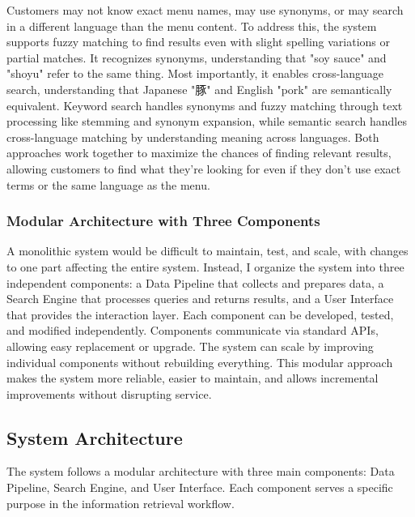 \documentclass[11pt,a4paper]{article}
\begin{document}
Customers may not know exact menu names, may use synonyms, or may search in a different language than the menu content. To address this, the system supports fuzzy matching to find results even with slight spelling variations or partial matches. It recognizes synonyms, understanding that "soy sauce" and "shoyu" refer to the same thing. Most importantly, it enables cross-language search, understanding that Japanese "豚" and English "pork" are semantically equivalent. Keyword search handles synonyms and fuzzy matching through text processing like stemming and synonym expansion, while semantic search handles cross-language matching by understanding meaning across languages. Both approaches work together to maximize the chances of finding relevant results, allowing customers to find what they're looking for even if they don't use exact terms or the same language as the menu.

\subsubsection{Modular Architecture with Three Components}

A monolithic system would be difficult to maintain, test, and scale, with changes to one part affecting the entire system. Instead, I organize the system into three independent components: a Data Pipeline that collects and prepares data, a Search Engine that processes queries and returns results, and a User Interface that provides the interaction layer. Each component can be developed, tested, and modified independently. Components communicate via standard APIs, allowing easy replacement or upgrade. The system can scale by improving individual components without rebuilding everything. This modular approach makes the system more reliable, easier to maintain, and allows incremental improvements without disrupting service.

\subsection{System Architecture}

The system follows a modular architecture with three main components: Data Pipeline, Search Engine, and User Interface. Each component serves a specific purpose in the information retrieval workflow.
\end{document}
